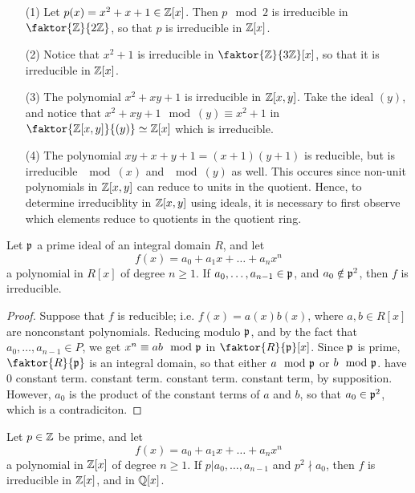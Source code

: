 \begin{example}\label{example_7.5}
    \begin{enumerate}
        \item[(1)] Let $p(x)=x^2+x+1 \in \mathbb{Z}[x]$. Then $p \mod{2}$ is irreducible
            in $\faktor{\Z}{2\Z}$, so that $p$ is irreducible in  $\mathbb{Z}[x]$.

        \item[(2)] Notice that $x^2+1$ is irreducible in  $\faktor{\Z}{3\Z}[x]$,
            so that it is irreducible in $\mathbb{Z}[x]$.

        \item[(3)] The polynomial $x^2+xy+1$ is irreducible in  $\mathbb{Z}[x,y]$. Take
            the ideal $(y)$, and notice that $x^2+xy+1 \mod{(y)} \equiv x^2+1$
            in $\faktor{\Z[x,y]}{(y)} \simeq \Z[x]$ which is irreducible.

        \item[(4)] The polynomial $xy+x+y+1=(x+1)(y+1)$ is reducible, but is
            irreducible $\mod{(x)}$ and $\mod{(y)}$ as well. This occures since
            non-unit polynomials in $\mathbb{Z}[x,y]$ can reduce to units in the
            quotient. Hence, to determine irreduciblity in $\mathbb{Z}[x,y]$ using
            ideals, it is necessary to first observe which elements reduce to
            quotients in the quotient ring.
    \end{enumerate}
\end{example}

\begin{theorem}\label{theorem_7.3.4}
    Let $\mathfrak{p}$ a prime ideal of an integral domain $R$, and let
    \begin{equation*}
        f(x)=a_0+a_1x+\dots+a_nx^n
    \end{equation*}
    a polynomial in $R[x]$ of degree $n \geq 1$. If $a_0, \dots, a_{n-1} \in
    \mathfrak{p}$, and $a_0 \notin \mathfrak{p}^2$, then $f$ is irreducible.
\end{theorem}
\begin{proof}
    Suppose that $f$ is reducible; i.e.  $f(x)=a(x)b(x)$, where $a,b \in R[x]$
    are nonconstant polynomials. Reducing modulo $\mathfrak{p}$, and by the fact that
    $a_0, \dots, a_{n-1} \in P$, we get $x^n \equiv ab \mod{\mathfrak{p}}$ in
    $\faktor{R}{\pf}[x]$. Since $\mathfrak{p}$ is prime,  $\faktor{R}{\pf}$ is an integral
    domain, so that either $a \mod{\mathfrak{p}}$ or $b \mod{\mathfrak{p}}$. have $0$ constant term.
    constant term. constant term. constant term, by supposition. However, $a_0$
    is the product of the constant terms of $a$ and $b$, so that $a_0 \in \mathfrak{p}^2$,
    which is a contradiciton.
\end{proof}
\begin{corollary}
    Let $p \in \mathbb{Z}$ be prime, and let
    \begin{equation*}
        f(x)=a_0+a_1x+\dots+a_nx^n
    \end{equation*}
    a polynomial in $\mathbb{Z}[x]$ of degree $n \geq 1$. If $p|a_0, \dots, a_{n-1}$ and
    $p^2 \nmid a_0$, then $f$ is irreducible in  $\mathbb{Z}[x]$, and in $\mathbb{Q}[x]$.
\end{corollary}

